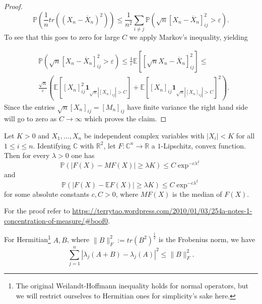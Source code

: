 \begin{proof}
	$$
	\mathbb P\left(\frac{1}{n}tr\left((X_n-\overline X_n)^2\right)\right)\leq
	\frac{1}{n^2}\sum_{i\neq j}\mathbb P\left(\sqrt n[X_n-\overline X_n]_{ij}^2>\varepsilon\right).
	$$
	To see that this goes to zero for large $C$ we apply Markov's inequality, yielding 
	
	\begin{align*}
		&\mathbb P(\sqrt n[X_n-\overline X_n]_{ij}^2>\varepsilon)\leq
	\frac{1}{\varepsilon}\mathbb E\left[[\sqrt n X_n-\overline X_n]_{ij}^2\right]\leq\\
	&\frac{\sqrt n}{\varepsilon}\left(\mathbb E[[X_n]_{ij}^2\mathbf 1_{\sqrt n |[X_n]_{ij}|>C}]+\mathbb E[[X_n]_{ij}\mathbf 1_{\sqrt n |[X_n]_{ij}|>C}]^2\right).
	\end{align*}
	Since the entries $\sqrt n [X_n]_{ij}=[M_n]_{ij}$ have finite variance the right hand side will go to zero as $C\rightarrow\infty$ which proves the claim.
\end{proof}

\begin{theorem}
	Let $K>0$ and $X_1,\dots,X_n$ be independent complex variables with $|X_i|<K$ for all $1\leq i\leq n$. Identifying $\mathbb C$ with $\mathbb R^2$, let $F:\mathbb C^n\rightarrow\mathbb R$ a $1$-Lipschitz, convex function. Then for every $\lambda>0$ one has
	$$\mathbb P(|F(X)-MF(X)|\geq \lambda K)\leq C\exp^{-c\lambda^2}$$ and $$\mathbb P(|F(X)-\mathbb EF(X)|\geq \lambda K)\leq C\exp^{-c\lambda^2}$$
	for some absolute constants $c,C>0$, where $MF(X)$ is the median of $F(X)$.
\end{theorem}
For the proof refer to \url{https://terrytao.wordpress.com/2010/01/03/254a-notes-1-concentration-of-measure/#boof0}.

\begin{theorem}
	For Hermitian\footnote{The original Weilandt-Hoffmann inequality holds for normal operators, but we will restrict ourselves to Hermitian ones for simplicity's sake here.} $A,B$, where $\|B\|_F^2:=tr(B^2)^{\frac{1}{2}}$ is the Frobenius norm, we have
	$$\sum_{j=1}^n|\lambda_j(A+B)-\lambda_j(A)|^2\leq\|B\|_F^2.$$
\end{theorem}

